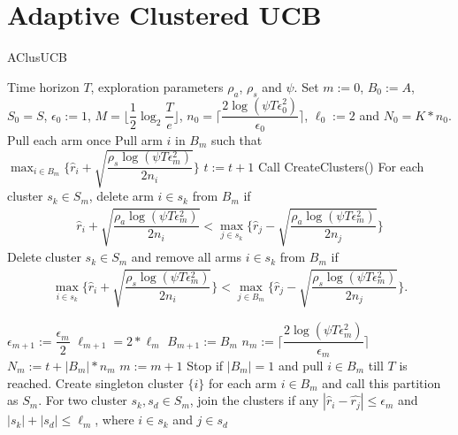 \section{Adaptive Clustered UCB}

\begin{algorithm}[t]
\caption{AClusUCB}
\label{alg:aclusucb}
\begin{algorithmic}
 Time horizon $T$, exploration parameters $\rho_a$, $\rho_s$ and $\psi$.
 Set $m:=0$, $B_{0}:=A$, $S_0 = S$, $\epsilon_{0}:=1$, $M=\big \lfloor \dfrac{1}{2}\log_{2} \dfrac{T}{e}\big\rfloor$, $n_{0}=\bigg\lceil\dfrac{2\log{(\psi T\epsilon_{0}^{2})}}{\epsilon_{0}}\bigg\rceil$, $\ell_{0}:=2$ and  $N_{0}=K*n_{0}$.
\State Pull each arm once
\State Pull arm $i$ in $B_m$ such that $\max_{i\in B_{m}}\bigg\lbrace \hat{r}_{i} + \sqrt{\dfrac{\rho_{s}\log{(\psi T\epsilon_{m}^{2})}}{2 n_{i}}} \bigg\rbrace$
\State $t:=t+1$
\State Call CreateClusters()
\ArmElim
\State For each cluster $s_k \in S_{m}$, delete arm ${i}\in s_{k}$ from $B_{m}$ if
\begin{align*}
\hat{r}_{i} + \sqrt{\dfrac{\rho_{a}\log{(\psi T\epsilon_{m}^{2})}}{2 n_{i}}}  < \max_{{j}\in s_{k}}\bigg\lbrace\hat{r}_{j} -\sqrt{\dfrac{\rho_{a}\log{(\psi T\epsilon_{m}^{2})}}{2 n_{j}}} \bigg\rbrace
\end{align*}
\EndArmElim
\ClusElim
\State Delete cluster $s_{k}\in S_{m}$ and remove all arms $i\in s_{k}$ from $B_{m}$ if 
\begin{align*}
 \max_{{i}\in s_{k}}\bigg\lbrace\hat{r}_{i} + \sqrt{\dfrac{\rho_{s}\log{(\psi T\epsilon_{m}^{2})}}{2 n_{i}}}\bigg\rbrace 
 < \max_{{j}\in B_{m}} \bigg\lbrace\hat{r}_{j} - \sqrt{\dfrac{\rho_{s} \log{(\psi T\epsilon_{m}^{2})}}{2 n_{j}}}\bigg\rbrace.
\end{align*}
\EndClusElim

\ResParam
\State $\epsilon_{m+1}:=\dfrac{\epsilon_{m}}{2}$\vspace{0.5ex}
\State $\ell_{m+1}=2*\ell_{m}$
\State $B_{m+1}:=B_{m}$
\State $n_{m}:=\bigg\lceil\dfrac{2\log{(\psi T\epsilon_{m}^{2})}}{\epsilon_{m}}\bigg\rceil$
\State $N_{m}:=t+|B_{m}| * n_{m}$
\State $m:=m+1$
\EndResParam
\State Stop if $|B_{m}|=1$ and pull ${i}\in B_{m}$ till $T$ is reached.
\EndIf
\EndFor
{}
\State Create singleton cluster $\lbrace i\rbrace$ for each arm $i\in B_{m}$ and call this partition as $S_{m}$.
\State For two cluster $s_{k},s_{d}\in S_{m}$, join the clusters if any $|\hat{r}_{i}-\hat{r_{j}}| \leq \epsilon_{m}$ and $|s_{k}|+|s_{d}|\leq \ell_{m}$, where $i\in s_{k}$ and $j\in s_{d}$ 
\EndProcedure
\end{algorithmic}
\end{algorithm}

